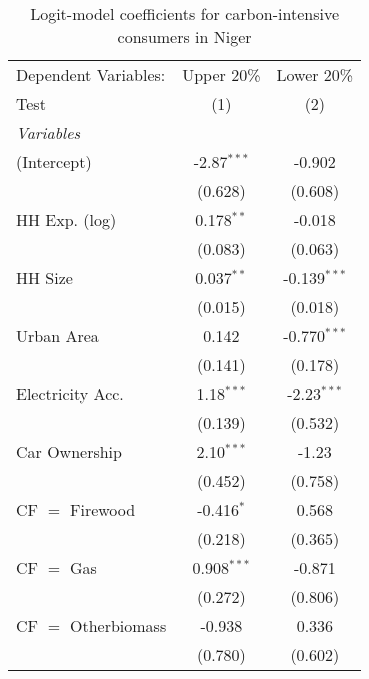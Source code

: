 
\begin{table}[htbp!]
   \centering
   \small
   \begin{adjustbox}{width = 1\textwidth, max height = 0.95\textheight, center}
      \begin{threeparttable}[b]
         \caption{\label{tab:Logit_1_NER} Logit-model coefficients for carbon-intensive consumers in Niger}
         \begin{tabular}{lcc}
            \tabularnewline \midrule \midrule
            Dependent Variables: & Upper 20\%    & Lower 20\%\\   
            Test                 & (1)           & (2)\\  
            \midrule
            \emph{Variables}\\
            (Intercept)          & -2.87$^{***}$ & -0.902\\   
                                 & (0.628)       & (0.608)\\   
            HH Exp. (log)        & 0.178$^{**}$  & -0.018\\   
                                 & (0.083)       & (0.063)\\   
            HH Size              & 0.037$^{**}$  & -0.139$^{***}$\\   
                                 & (0.015)       & (0.018)\\   
            Urban Area           & 0.142         & -0.770$^{***}$\\   
                                 & (0.141)       & (0.178)\\   
            Electricity Acc.     & 1.18$^{***}$  & -2.23$^{***}$\\   
                                 & (0.139)       & (0.532)\\   
            Car Ownership        & 2.10$^{***}$  & -1.23\\   
                                 & (0.452)       & (0.758)\\   
            CF $=$ Firewood      & -0.416$^{*}$  & 0.568\\   
                                 & (0.218)       & (0.365)\\   
            CF $=$ Gas           & 0.908$^{***}$ & -0.871\\   
                                 & (0.272)       & (0.806)\\   
            CF $=$ Otherbiomass  & -0.938        & 0.336\\   
                                 & (0.780)       & (0.602)\\   

\end{tabular}
\end{threeparttable}
\end{adjustbox}
\end{table}
